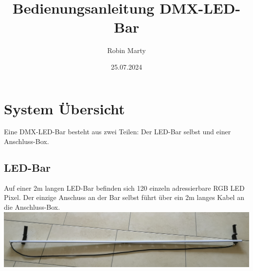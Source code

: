 \documentclass{article}
\title{Bedienungsanleitung DMX-LED-Bar}
\author{Robin Marty}
\date{25.07.2024}
\begin{document}
\maketitle
{}
\newpage
{}
\section {System Übersicht}
Eine DMX-LED-Bar besteht aus zwei Teilen: Der LED-Bar selbst und einer Anschluss-Box.

\subsection{LED-Bar}
Auf einer 2m langen LED-Bar befinden sich 120 einzeln adressierbare RGB LED Pixel. Der einzige Anschuss an der Bar selbst führt über ein 2m langes Kabel an die Anschluss-Box.\\
\includegraphics[width = \textwidth]{LED-Bar}
\end{document}
